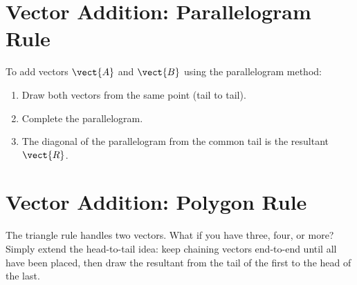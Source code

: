 \section{Vector Addition: Parallelogram Rule}

\begin{lawbox}
To add vectors $\vect{A}$ and $\vect{B}$ using the
parallelogram method:
\begin{enumerate}[noitemsep]
  \item Draw both vectors from the same point (tail to tail).
  \item Complete the parallelogram.
  \item The diagonal of the parallelogram from the common
  tail is the resultant $\vect{R}$.
\end{enumerate}
\end{lawbox}

\begin{diagbox}
\begin{center}
\end{center}
\end{diagbox}

\section{Vector Addition: Polygon Rule}
\label{sec:polygon_rule}

The triangle rule handles two vectors. What if you have
three, four, or more? Simply extend the head-to-tail
idea: keep chaining vectors end-to-end until all have
been placed, then draw the resultant from the tail of
the first to the head of the last.


